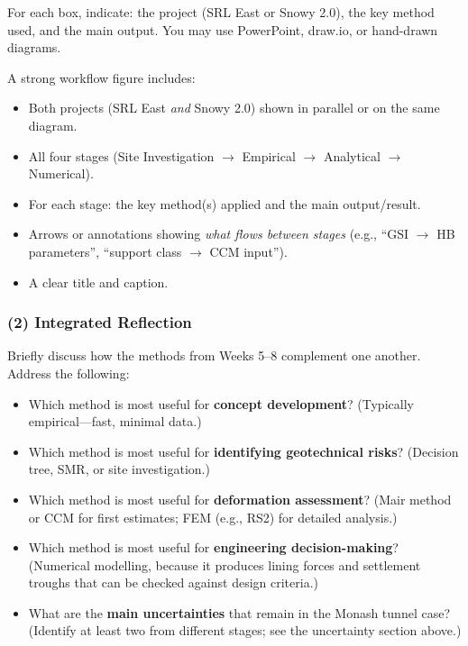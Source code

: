 \documentclass[a4paper,12pt]{article}
\begin{document}
For each box, indicate: the project (SRL East or Snowy 2.0), the key method used, and the main output. You may use PowerPoint, draw.io, or hand-drawn diagrams.

\begin{deliverablebox}
A strong workflow figure includes:
\begin{itemize}[nosep]
    \item Both projects (SRL East \textit{and} Snowy 2.0) shown in parallel or on the same diagram.
    \item All four stages (Site Investigation $\to$ Empirical $\to$ Analytical $\to$ Numerical).
    \item For each stage: the key method(s) applied and the main output/result.
    \item Arrows or annotations showing \textit{what flows between stages} (e.g., ``GSI $\to$ HB parameters'', ``support class $\to$ CCM input'').
    \item A clear title and caption.
\end{itemize}
\end{deliverablebox}

\subsubsection{(2) Integrated Reflection}
Briefly discuss how the methods from Weeks 5--8 complement one another. Address the following:
\begin{itemize}
    \item Which method is most useful for \textbf{concept development}? (Typically empirical---fast, minimal data.)
    \item Which method is most useful for \textbf{identifying geotechnical risks}? (Decision tree, SMR, or site investigation.)
    \item Which method is most useful for \textbf{deformation assessment}? (Mair method or CCM for first estimates; FEM (e.g., RS2) for detailed analysis.)
    \item Which method is most useful for \textbf{engineering decision-making}? (Numerical modelling, because it produces lining forces and settlement troughs that can be checked against design criteria.)
    \item What are the \textbf{main uncertainties} that remain in the Monash tunnel case? (Identify at least two from different stages; see the uncertainty section above.)
\end{itemize}
\end{document}
